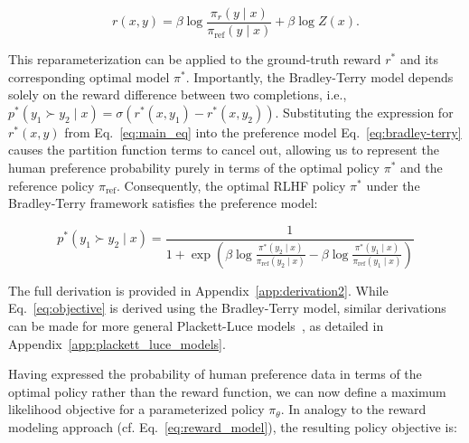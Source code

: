 \begin{equation}\label{eq:main_eq}
    r(x,y) =\beta \log \frac{\pi_r(y\mid x)}{\pi_\text{ref}(y\mid x)} + \beta \log Z(x).
\end{equation}

This reparameterization can be applied to the ground-truth reward $r^*$ and its corresponding optimal model $\pi^*$. Importantly, the Bradley-Terry model depends solely on the reward difference between two completions, i.e., ${p^*(y_1 \succ y_2 \mid x) = \sigma(r^*(x, y_1) - r^*(x, y_2))}$. Substituting the expression for $r^*(x,y)$ from Eq.~\ref{eq:main_eq} into the preference model Eq.~\ref{eq:bradley-terry} causes the partition function terms to cancel out, allowing us to represent the human preference probability purely in terms of the optimal policy $\pi^*$ and the reference policy $\pi_\text{ref}$. Consequently, the optimal RLHF policy $\pi^*$ under the Bradley-Terry framework satisfies the preference model:

\begin{equation}\label{eq:objective}
    p^*(y_1\succ y_2 \mid x)=\frac{1}{1 + \exp\left(\beta \log \frac{\pi^*(y_2\mid x)}{\pi_\text{ref}(y_2\mid x)} - \beta \log \frac{\pi^*(y_1\mid x)}{\pi_\text{ref}(y_1\mid x)}\right)}
\end{equation}

The full derivation is provided in Appendix~\ref{app:derivation2}. While Eq.~\ref{eq:objective} is derived using the Bradley-Terry model, similar derivations can be made for more general Plackett-Luce models~\citep{plackett1975analysis, luce2012individual}, as detailed in Appendix~\ref{app:plackett_luce_models}.

Having expressed the probability of human preference data in terms of the optimal policy rather than the reward function, we can now define a maximum likelihood objective for a parameterized policy $\pi_\theta$. In analogy to the reward modeling approach (cf. Eq.~\ref{eq:reward_model}), the resulting policy objective is:

